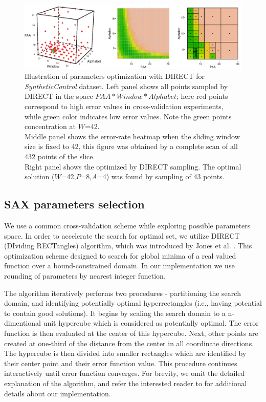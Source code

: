 \documentclass{llncs}
\newcommand{\myfigureshrinker}{\vspace{-1cm}}
\begin{document}
\begin{figure}[t]
   \myfigureshrinker
   \centering
   \includegraphics[width=120mm]{figures/figure_direct.eps}
   \caption{Illustration of parameters optimization with DIRECT 
   for \textit{SyntheticControl} dataset. 
   Left panel shows all points sampled by DIRECT in the space $PAA*Window*Alphabet$; here
   red points correspond to high error values in cross-validation experiments, while green color 
   indicates low error values. Note the green points concentration at $W$=42.\\ 
   Middle panel shows the error-rate heatmap when the sliding window size is fixed to 42, 
   this figure was obtained by a complete scan of all 432 points of the slice.\\ 
   Right panel shows the optimized by DIRECT sampling. The optimal solution 
   ($W$=42,$P$=8,$A$=4) was found by sampling of 43 points.}
   \label{fig:direct-sampling}
\end{figure}

\subsection{SAX parameters selection} \label{section-direct}
We use a common cross-validation scheme while exploring possible parameters space. 
In order to accelerate the search for optimal set, 
we utilize DIRECT (DIviding RECTangles) algorithm, which 
was introduced by Jones et al. \cite{direct-original}. This optimization scheme 
designed to search for global minima of a real valued function over a bound-constrained domain. 
In our implementation we use rounding of parameters by nearest integer function.

The algorithm iteratively performs two procedures - partitioning the search domain, 
and identifying potentially optimal hyperrectangles (i.e., having potential to contain good
solutions). 
It begins by scaling the search domain to a n-dimentional unit hypercube which is considered 
as potentially optimal. The error function is then evaluated at the center of this hypercube. Next, 
other points are created at one-third of the distance from the center in all coordinate directions. 
The hypercube is then divided into smaller rectangles which are identified by their center point 
and their error function value. This procedure continues interactively until error function
converges.
For brevity, we omit the detailed explanation of the algorithm, and refer the 
interested reader to \cite{direct} for additional details about our implementation.
\end{document}
